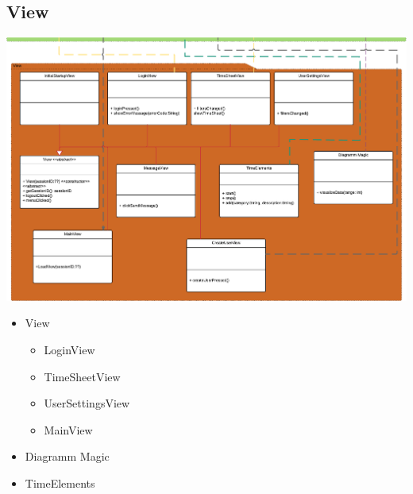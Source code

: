     \subsection{View}
    \includegraphics[width=\linewidth]{Diagramms/class/view.pdf}\\
        \begin{itemize}
            \item{View}
                \begin{itemize}
                    \item{LoginView}
                    \item{TimeSheetView}
                    \item{UserSettingsView}
                    \item{MainView}
                \end{itemize}
            \item{Diagramm Magic}
            \item{TimeElements}
        \end{itemize}
